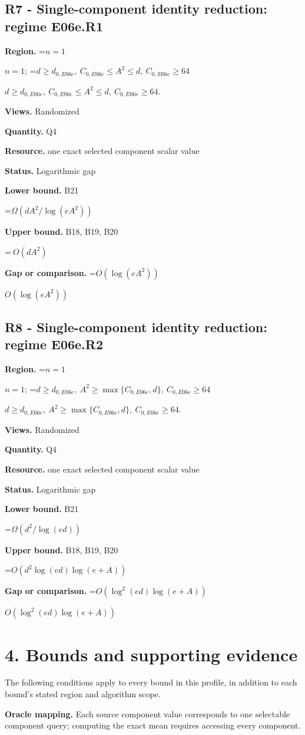 \documentclass[10pt,a4paper]{article}
\newcommand{\AtlasMath}[1]{\par\begingroup\centering\setbox0=\hbox{$\displaystyle #1$}\ifdim\wd0>1.4\linewidth\typeout{ATLAS WIDE FORMULA: \the\wd0}\fi\ifdim\wd0>\linewidth\resizebox{\linewidth}{!}{\box0}\else\box0\fi\par\endgroup}
\newcommand{\AtlasInlineMath}[1]{\begingroup\setbox0=\hbox{$#1$}\ifdim\wd0>.4\linewidth\endgroup\AtlasMath{#1}\else\endgroup$#1$\fi}
\begin{document}
\subsection{R7 - Single-component identity reduction: regime E06e.R1}
\textbf{Region.} \AtlasInlineMath{n=1}; \AtlasInlineMath{d\ge d_{0,E06e},\ C_{0,E06e}\le A^2\le d,\ C_{0,E06e}\ge64}.

\textbf{Views.} Randomized

\textbf{Quantity.} Q4

\textbf{Resource.} one exact selected component scalar value

\textbf{Status.} Logarithmic gap

\textbf{Lower bound.} B21

\AtlasMath{\Omega(dA^2/\log(eA^2))}
\textbf{Upper bound.} B18, B19, B20

\AtlasMath{\ O(dA^2)}
\textbf{Gap or comparison.} \AtlasInlineMath{O(\log(eA^2))}

\subsection{R8 - Single-component identity reduction: regime E06e.R2}
\textbf{Region.} \AtlasInlineMath{n=1}; \AtlasInlineMath{d\ge d_{0,E06e},\ A^2\ge\max\{C_{0,E06e},d\},\ C_{0,E06e}\ge64}.

\textbf{Views.} Randomized

\textbf{Quantity.} Q4

\textbf{Resource.} one exact selected component scalar value

\textbf{Status.} Logarithmic gap

\textbf{Lower bound.} B21

\AtlasMath{\Omega(d^2/\log(ed))}
\textbf{Upper bound.} B18, B19, B20

\AtlasMath{O(d^2\log(ed)\log(e+A))}
\textbf{Gap or comparison.} \AtlasInlineMath{O(\log^2(ed)\log(e+A))}

\section{4. Bounds and supporting evidence}
The following conditions apply to every bound in this profile, in addition to each bound's stated region and algorithm scope.

\textbf{Oracle mapping.} Each source component value corresponds to one selectable component query; computing the exact mean requires accessing every component.
\end{document}
